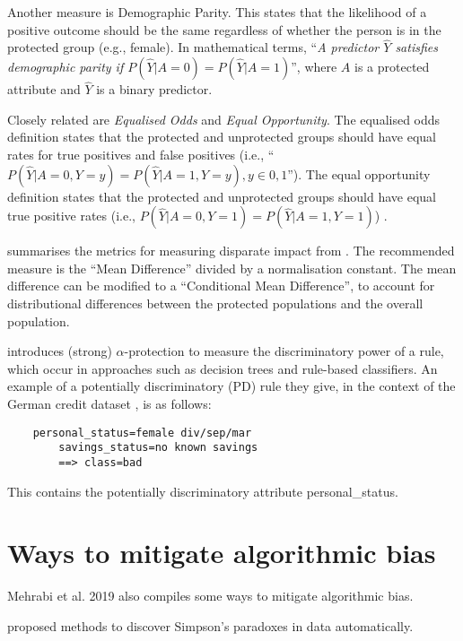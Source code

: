 \documentclass[conference]{IEEEtran}
\begin{document}
Another measure is Demographic Parity. This states that the likelihood of a positive outcome \cite{10.1145/3194770.3194776} should be the same regardless of whether the person is in the protected group (e.g., female). In mathematical terms, ``\textit{A predictor $\hat{Y}$ satisfies demographic parity if $P(\hat{Y}|A=0) = P(\hat{Y}|A=1)$}'', where $A$ is a protected attribute and $\hat{Y}$ is a binary predictor.  

Closely related are \textit{Equalised Odds} and \textit{Equal Opportunity}. The equalised odds definition states that the protected and unprotected groups should have equal rates for true positives and false positives (i.e., ``$P(\hat{Y}|A=0, Y=y) = P(\hat{Y}|A=1, Y=y), y \in {0,1}$''). The equal opportunity definition states that the protected and unprotected groups should have equal true positive rates (i.e., $P(\hat{Y}|A=0, Y=1) = P(\hat{Y}|A=1, Y=1)$) \cite{DBLP:journals/corr/HardtPS16}.

\cite{d_Alessandro_2017} summarises the metrics for measuring disparate impact from \cite{DBLP:journals/corr/Zliobaite15a}. The recommended measure is the ``Mean Difference'' divided by a normalisation constant. The mean difference can be modified to a ``Conditional Mean Difference'', to account for distributional differences between the protected populations and the overall population.

\cite{10.1145/1401890.1401959} introduces (strong) $\alpha$-protection to measure the discriminatory power of a rule, which occur in approaches such as decision trees and rule-based classifiers. An example of a potentially discriminatory (PD) rule they give, in the context of the German credit dataset \cite{Dua:2019}, is as follows: 

\begin{lstlisting}
    personal_status=female div/sep/mar 
        savings_status=no known savings 
        ==> class=bad    
\end{lstlisting}

This contains the potentially discriminatory attribute personal\_status.

\section{Ways to mitigate algorithmic bias}
Mehrabi et al. 2019 \cite{DBLP:journals/corr/abs-1908-09635} also compiles some ways to mitigate algorithmic bias.

\cite{DBLP:journals/corr/abs-1801-04385, DBLP:journals/corr/abs-1805-03094} proposed methods to discover
Simpson’s paradoxes in data automatically.
\end{document}
